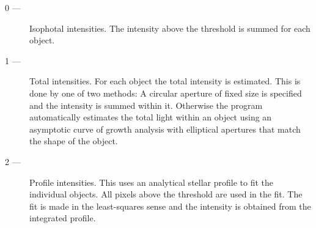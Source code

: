 \begin{small}
{{{\begin{description}
         \item[0 ---] Isophotal intensities. The intensity above the threshold
               is summed for each object.
         \item[1 ---] Total intensities. For each object the total intensity is
               estimated. This is done by one of two methods: A circular
               aperture of fixed size is specified and the intensity is
               summed within it. Otherwise the program automatically
               estimates the total light within an object using an
               asymptotic curve of growth analysis with elliptical
               apertures that match the shape of the object.
         \item[2 ---] Profile intensities. This uses an analytical stellar
               profile to fit the individual objects. All pixels above
               the threshold are used in the fit. The fit is made in the
               least-squares sense and the intensity is obtained from
               the integrated profile.
        \end{description}
      }
      }}
\end{small}
